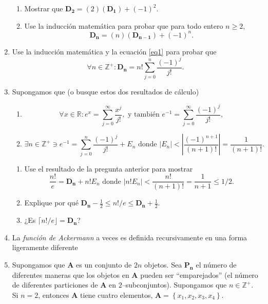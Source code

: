 \begin{enumerate}
\begin{enumerate}
				\item Mostrar que $\bm{D_2}=(2)\left(\bm{D_1}\right)+(-1)^2$.
				\item Use la inducción matemática para probar que para todo entero $n\geq 2$, \[ \bm{D_n}=(n)(\bm{D_{n-1}})+(-1)^n. \]
    \end{enumerate}
    \item Use la inducción matemática y la ecuación \eqref{eq1} para probar que \[ \forall n\in\mathds{Z}^{+}\colon\bm{D_n}=n!\sum_{j=0}^n\frac{(-1)^j}{j!}. \]
    \item Supongamos que (o busque estos dos resultados de cálculo)
    \begin{enumerate}
    	\item \[ \forall x\in\mathds{R}\colon e^x=\sum_{j=0}^\infty\frac{x^j}{j!},\text{ y también }e^{-1}=\sum_{j=0}^\infty\frac{(-1)^j}{j!}, \]
    	\item \[ \exists n\in\mathds{Z}^{+}\ni e^{-1}=\sum_{j=0}^n\frac{(-1)^j}{j!}+E_n \text{ donde }|E_n|<\left|\frac{(-1)^{n+1}}{(n+1)!}\right|=\frac{1}{(n+1)!}. \]
    \end{enumerate}
  
    \begin{enumerate}
        \item Use el resultado de la pregunta anterior para mostrar \[ \frac{n!}{e}=\bm{D_n}+n!E_n\text{ donde }|n!E_n|<\frac{n!}{(n+1)!}=\frac{1}{n+1}\leq 1/2. \]
        \item Explique por qué $\bm{D_n}-\tfrac{1}{2}\leq n!/e\leq\bm{D_n}+\tfrac{1}{2}$.
        \item ¿Es $\lceil n!/e\rfloor=\bm{D_n}$?%
    \end{enumerate}
    \item La \emph{función de Ackermann} a veces es definida recursivamente en una forma ligeramente diferente
    \item Supongamos que $\bm{A}$ es un conjunto de $2n$ objetos. Sea $\bm{P_n}$ el número de diferentes maneras que los objetos en $\bm{A}$ pueden ser ``emparejados'' (el número de diferentes particiones de $\bm{A}$ en $2$--subconjuntos). Supongamos que $n\in\mathds{Z}^{+}$. Si $n=2$, entonces $\bm{A}$ tiene cuatro elementos, $\bm{A}=\left\{x_1,x_2,x_3,x_4\right\}$.
    

\end{enumerate}

